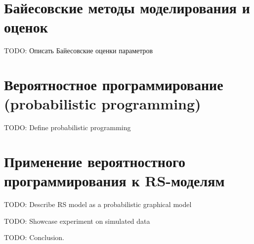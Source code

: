 \documentclass[a4paper,14pt]{extreport}
\begin{document}
\section{Байесовские методы моделирования и оценок}

TODO: Описать Байесовские оценки параметров


\section{Вероятностное программирование (probabilistic programming)}

TODO: Define probabilistic programming


\section{Применение вероятностного программирования к RS-моделям}

TODO: Describe RS model as a probabilistic graphical model

TODO: Showcase experiment on simulated data



TODO: Conclusion.


\printbibliography[title=Список использованных источников]



\end{document}
